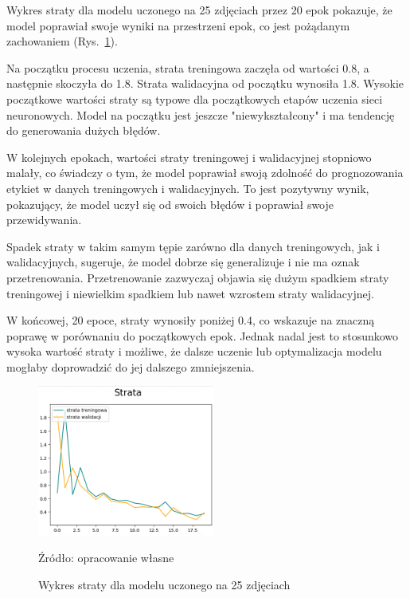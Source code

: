 \newpage

Wykres straty dla modelu uczonego na 25 zdjęciach przez 20 epok pokazuje, że model poprawiał swoje wyniki na przestrzeni epok, co jest pożądanym zachowaniem (Rys.~\ref{fig:wykres_strata_25}).

Na początku procesu uczenia, strata treningowa zaczęła od wartości 0.8, a następnie skoczyła do 1.8. Strata walidacyjna od początku wynosiła 1.8. Wysokie początkowe wartości straty są typowe dla początkowych etapów uczenia sieci neuronowych. Model na początku jest jeszcze "niewykształcony" i ma tendencję do generowania dużych błędów.

W kolejnych epokach, wartości straty treningowej i walidacyjnej stopniowo malały, co świadczy o tym, że model poprawiał swoją zdolność do prognozowania etykiet w danych treningowych i walidacyjnych. To jest pozytywny wynik, pokazujący, że model uczył się od swoich błędów i poprawiał swoje przewidywania.

Spadek straty w takim samym tępie zarówno dla danych treningowych, jak i walidacyjnych, sugeruje, że model dobrze się generalizuje i nie ma oznak przetrenowania. Przetrenowanie zazwyczaj objawia się dużym spadkiem straty treningowej i niewielkim spadkiem lub nawet wzrostem straty walidacyjnej.

W końcowej, 20 epoce, straty wynosiły poniżej 0.4, co wskazuje na znaczną poprawę w porównaniu do początkowych epok. Jednak nadal jest to stosunkowo wysoka wartość straty i możliwe, że dalsze uczenie lub optymalizacja modelu mogłaby doprowadzić do jej dalszego zmniejszenia.

\begin{figure}[htbp]
  \centering
  \caption{Wykres straty dla modelu uczonego na 25 zdjęciach}
  \includegraphics[width=220px]{images/strata_25.png}
  \begin{center}
  \footnotesize{Źródło: opracowanie własne}
  \end{center}
  \label{fig:wykres_strata_25}
\end{figure}

